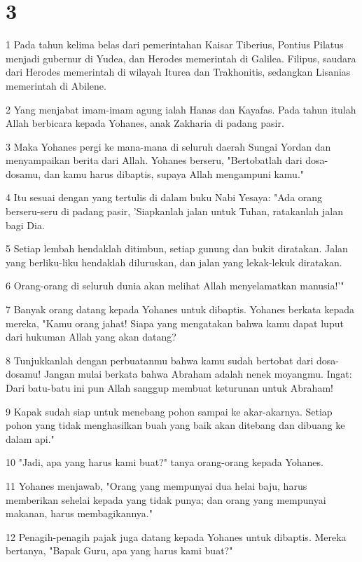 \chapter{3}

\par 1 Pada tahun kelima belas dari pemerintahan Kaisar Tiberius, Pontius Pilatus menjadi gubernur di Yudea, dan Herodes memerintah di Galilea. Filipus, saudara dari Herodes memerintah di wilayah Iturea dan Trakhonitis, sedangkan Lisanias memerintah di Abilene.
\par 2 Yang menjabat imam-imam agung ialah Hanas dan Kayafas. Pada tahun itulah Allah berbicara kepada Yohanes, anak Zakharia di padang pasir.
\par 3 Maka Yohanes pergi ke mana-mana di seluruh daerah Sungai Yordan dan menyampaikan berita dari Allah. Yohanes berseru, "Bertobatlah dari dosa-dosamu, dan kamu harus dibaptis, supaya Allah mengampuni kamu."
\par 4 Itu sesuai dengan yang tertulis di dalam buku Nabi Yesaya: "Ada orang berseru-seru di padang pasir, 'Siapkanlah jalan untuk Tuhan, ratakanlah jalan bagi Dia.
\par 5 Setiap lembah hendaklah ditimbun, setiap gunung dan bukit diratakan. Jalan yang berliku-liku hendaklah diluruskan, dan jalan yang lekak-lekuk diratakan.
\par 6 Orang-orang di seluruh dunia akan melihat Allah menyelamatkan manusia!'"
\par 7 Banyak orang datang kepada Yohanes untuk dibaptis. Yohanes berkata kepada mereka, "Kamu orang jahat! Siapa yang mengatakan bahwa kamu dapat luput dari hukuman Allah yang akan datang?
\par 8 Tunjukkanlah dengan perbuatanmu bahwa kamu sudah bertobat dari dosa-dosamu! Jangan mulai berkata bahwa Abraham adalah nenek moyangmu. Ingat: Dari batu-batu ini pun Allah sanggup membuat keturunan untuk Abraham!
\par 9 Kapak sudah siap untuk menebang pohon sampai ke akar-akarnya. Setiap pohon yang tidak menghasilkan buah yang baik akan ditebang dan dibuang ke dalam api."
\par 10 "Jadi, apa yang harus kami buat?" tanya orang-orang kepada Yohanes.
\par 11 Yohanes menjawab, "Orang yang mempunyai dua helai baju, harus memberikan sehelai kepada yang tidak punya; dan orang yang mempunyai makanan, harus membagikannya."
\par 12 Penagih-penagih pajak juga datang kepada Yohanes untuk dibaptis. Mereka bertanya, "Bapak Guru, apa yang harus kami buat?"
